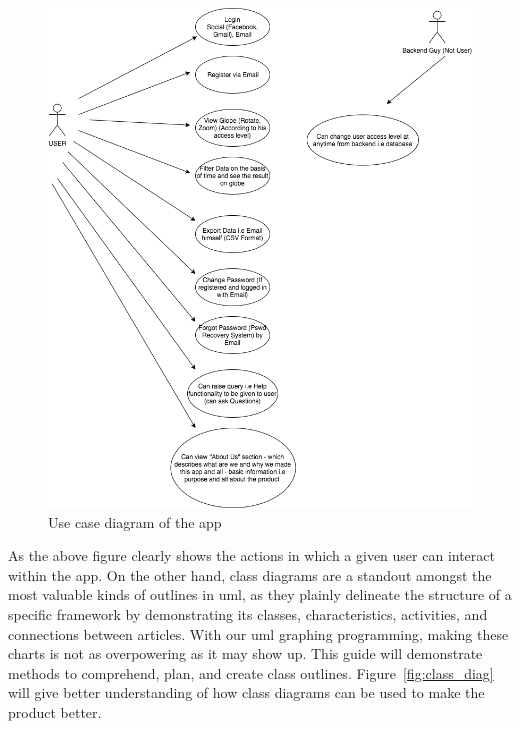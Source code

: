     \begin{figure}[H]
            \centering
            \includegraphics[width=1.0\linewidth]{figures/ch3/usecase.png}
            \caption{\label{fig:use_case} Use case diagram of the app}
    \end{figure}

As the above figure clearly shows the actions in which a given user can interact within the app. On the other hand, class diagrams are a standout amongst the most valuable kinds of outlines in \gls{uml}, as they plainly delineate the structure of a specific framework by demonstrating its classes, characteristics, activities, and connections between articles. With our  \gls{uml} graphing programming, making these charts is not as overpowering as it may show up. This guide will demonstrate methods to comprehend, plan, and create class outlines. Figure~\ref{fig:class_diag} will give better understanding of how class diagrams can be used to make the product better.

